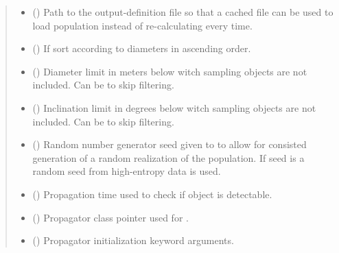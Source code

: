 \documentclass[letterpaper,10pt,english]{sphinxmanual}
\begin{document}
\begin{fulllineitems}
\begin{quote}
\begin{description}
\begin{itemize}
\item {} 
 () \textendash{} Path to the output-definition file so that a cached file can be used to load population instead of re-calculating every time.

\item {} 
 () \textendash{} If  sort according to diameters in ascending order.

\item {} 
 () \textendash{} Diameter limit in meters below witch sampling objects are not included. Can be  to skip filtering.

\item {} 
 () \textendash{} Inclination limit in degrees below witch sampling objects are not included. Can be  to skip filtering.

\item {} 
 () \textendash{} Random number generator seed given to  to allow for consisted generation of a random realization of the population. If seed is  a random seed from high-entropy data is used.

\item {} 
 () \textendash{} Propagation time used to check if object is detectable.

\item {} 
 ({\hyperref[\detokenize{modules/propagator_base:propagator_base.PropagatorBase}]{}}) \textendash{} Propagator class pointer used for {\hyperref[\detokenize{modules/space_object:space_object.SpaceObject}]{}}.

\item {} 
 () \textendash{} Propagator initialization keyword arguments.


\end{itemize}
\end{description}
\end{quote}
\end{fulllineitems}
\end{document}
